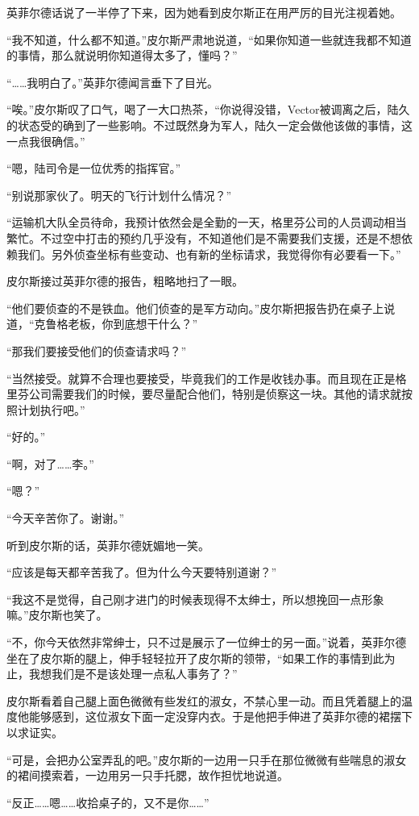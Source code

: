 英菲尔德话说了一半停了下来，因为她看到皮尔斯正在用严厉的目光注视着她。

“我不知道，什么都不知道。”皮尔斯严肃地说道，“如果你知道一些就连我都不知道的事情，那么就说明你知道得太多了，懂吗？”

“……我明白了。”英菲尔德闻言垂下了目光。

“唉。”皮尔斯叹了口气，喝了一大口热茶，“你说得没错，Vector被调离之后，陆久的状态受的确到了一些影响。不过既然身为军人，陆久一定会做他该做的事情，这一点我很确信。”

“嗯，陆司令是一位优秀的指挥官。”

“别说那家伙了。明天的飞行计划什么情况？”

“运输机大队全员待命，我预计依然会是全勤的一天，格里芬公司的人员调动相当繁忙。不过空中打击的预约几乎没有，不知道他们是不需要我们支援，还是不想依赖我们。另外侦查坐标有些变动、也有新的坐标请求，我觉得你有必要看一下。”

皮尔斯接过英菲尔德的报告，粗略地扫了一眼。

“他们要侦查的不是铁血。他们侦查的是军方动向。”皮尔斯把报告扔在桌子上说道，“克鲁格老板，你到底想干什么？”

“那我们要接受他们的侦查请求吗？”

“当然接受。就算不合理也要接受，毕竟我们的工作是收钱办事。而且现在正是格里芬公司需要我们的时候，要尽量配合他们，特别是侦察这一块。其他的请求就按照计划执行吧。”

“好的。”

“啊，对了……李。”

“嗯？”

“今天辛苦你了。谢谢。”

听到皮尔斯的话，英菲尔德妩媚地一笑。

“应该是每天都辛苦我了。但为什么今天要特别道谢？”

“我这不是觉得，自己刚才进门的时候表现得不太绅士，所以想挽回一点形象嘛。”皮尔斯也笑了。

“不，你今天依然非常绅士，只不过是展示了一位绅士的另一面。”说着，英菲尔德坐在了皮尔斯的腿上，伸手轻轻拉开了皮尔斯的领带，“如果工作的事情到此为止，我想我们是不是该处理一点私人事务了？”

皮尔斯看着自己腿上面色微微有些发红的淑女，不禁心里一动。而且凭着腿上的温度他能够感到，这位淑女下面一定没穿内衣。于是他把手伸进了英菲尔德的裙摆下以求证实。

“可是，会把办公室弄乱的吧。”皮尔斯的一边用一只手在那位微微有些喘息的淑女的裙间摸索着，一边用另一只手托腮，故作担忧地说道。

“反正……嗯……收拾桌子的，又不是你……”

